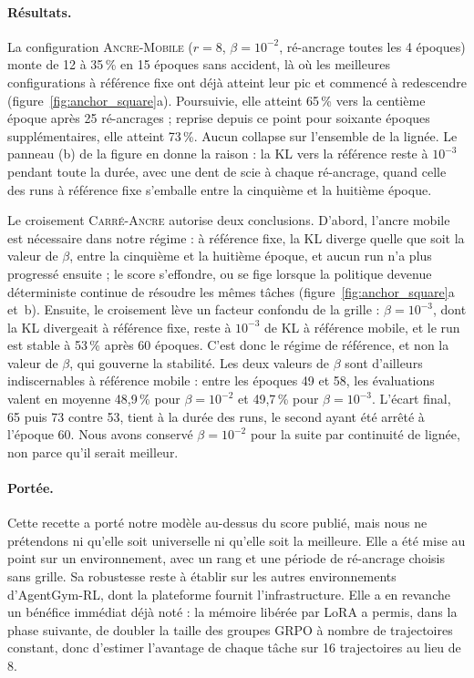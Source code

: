 \documentclass[11pt,a4paper]{article}
\begin{document}
\paragraph{Résultats.} La configuration \textsc{Ancre-Mobile} ($r=8$, $\beta=10^{-2}$, ré-ancrage toutes les 4 époques) monte de 12 à 35\,\% en 15 époques sans accident, là où les meilleures configurations à référence fixe ont déjà atteint leur pic et commencé à redescendre (figure~\ref{fig:anchor_square}a). Poursuivie, elle atteint 65\,\% vers la centième époque après 25 ré-ancrages ; reprise depuis ce point pour soixante époques supplémentaires, elle atteint 73\,\%. Aucun collapse sur l'ensemble de la lignée. Le panneau (b) de la figure en donne la raison : la KL vers la référence reste à $10^{-3}$ pendant toute la durée, avec une dent de scie à chaque ré-ancrage, quand celle des runs à référence fixe s'emballe entre la cinquième et la huitième époque.

Le croisement \textsc{Carré-Ancre} autorise deux conclusions. D'abord, l'ancre mobile est nécessaire dans notre régime : à référence fixe, la KL diverge quelle que soit la valeur de $\beta$, entre la cinquième et la huitième époque, et aucun run n'a plus progressé ensuite ; le score s'effondre, ou se fige lorsque la politique devenue déterministe continue de résoudre les mêmes tâches (figure~\ref{fig:anchor_square}a et~b). Ensuite, le croisement lève un facteur confondu de la grille : $\beta = 10^{-3}$, dont la KL divergeait à référence fixe, reste à $10^{-3}$ de KL à référence mobile, et le run est stable à 53\,\% après 60 époques. C'est donc le régime de référence, et non la valeur de $\beta$, qui gouverne la stabilité. Les deux valeurs de $\beta$ sont d'ailleurs indiscernables à référence mobile : entre les époques 49 et 58, les évaluations valent en moyenne 48{,}9\,\% pour $\beta=10^{-2}$ et 49{,}7\,\% pour $\beta=10^{-3}$. L'écart final, 65 puis 73 contre 53, tient à la durée des runs, le second ayant été arrêté à l'époque 60. Nous avons conservé $\beta=10^{-2}$ pour la suite par continuité de lignée, non parce qu'il serait meilleur.

\paragraph{Portée.} Cette recette a porté notre modèle au-dessus du score publié, mais nous ne prétendons ni qu'elle soit universelle ni qu'elle soit la meilleure. Elle a été mise au point sur un environnement, avec un rang et une période de ré-ancrage choisis sans grille. Sa robustesse reste à établir sur les autres environnements d'AgentGym-RL, dont la plateforme fournit l'infrastructure. Elle a en revanche un bénéfice immédiat déjà noté : la mémoire libérée par LoRA a permis, dans la phase suivante, de doubler la taille des groupes GRPO à nombre de trajectoires constant, donc d'estimer l'avantage de chaque tâche sur 16 trajectoires au lieu de 8.
\end{document}
